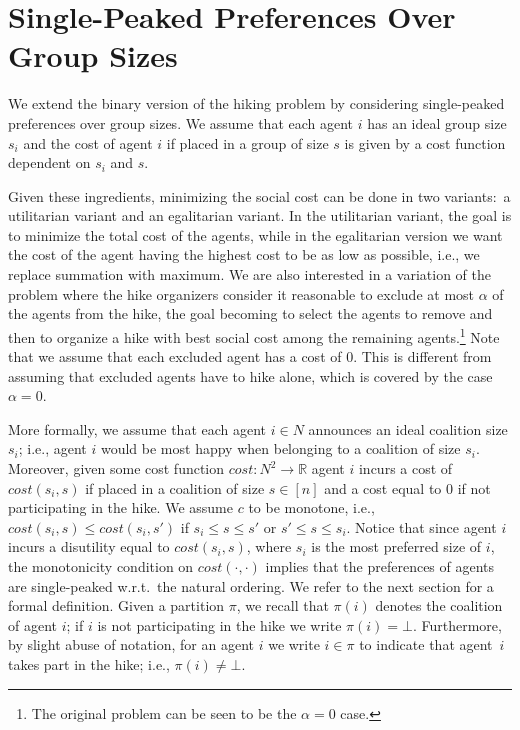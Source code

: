 \documentclass[a4paper]{article}
\newcommand{\cost}{\mathit{cost}}
\begin{document}

\section{Single-Peaked Preferences Over Group Sizes}\label{sec:distanceMin}

We extend the binary version of the hiking problem by considering single-peaked preferences over group sizes. We assume that each agent $i$ has an ideal group size $s_i$ and the cost of agent $i$ if placed in a group of size $s$ is given by a cost function dependent on $s_i$ and $s$.

Given these ingredients, minimizing the social cost can be done in two variants:~a utilitarian variant and an egalitarian variant. In the utilitarian variant, the goal is to minimize the total cost of the agents, while in the egalitarian version we want the cost of the agent having the highest cost to be as low as possible, i.e., we replace summation with maximum. We are also interested in a variation of the problem where the hike organizers consider it reasonable to exclude at most $\alpha$ of the agents from the hike, the goal becoming to select the agents to remove and then to organize a hike with best social cost among the remaining agents.\footnote{The original problem can be seen to be the $\alpha = 0$ case.} Note that we assume that each excluded agent has a cost of $0$. This is different from assuming that excluded agents have to hike alone, which is covered by the case $\alpha=0$.

More formally, we assume that each agent $i \in N$ announces an ideal coalition size $s_i$; i.e., agent $i$ would be most happy when belonging to a coalition of size $s_i$. 
Moreover, given some cost function $\cost: N^2 \rightarrow \mathbb{R}$ agent $i$ incurs a cost of $\cost(s_i,s)$ if placed in a coalition of size $s \in [n]$ and a cost equal to $0$ if not participating in the hike. We assume $c$ to be monotone, i.e., $\cost(s_i,s) \leq \cost(s_i,s')$ if $s_i \leq s \leq s'$ or $s' \leq s \leq s_i$.  Notice that since agent $i$ incurs a disutility equal to $\cost(s_i,s)$, where $s_i$ is the most preferred size of $i$, the monotonicity condition on $\cost(\cdot, \cdot)$ implies that the preferences of agents are single-peaked w.r.t.\ the natural ordering. We refer to the next section for a formal definition.
Given a partition $\pi$, we recall that $\pi(i)$ denotes the coalition of agent $i$; if $i$ is not participating in the hike we write $\pi(i)=\bot$. Furthermore, by slight abuse of notation, for an agent $i$ we write $i \in \pi$ to indicate that agent~$i$ takes part in the hike; i.e., $\pi(i) \neq \bot.$
\end{document}

